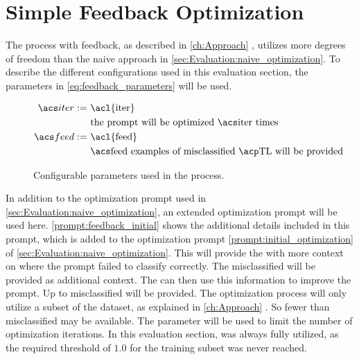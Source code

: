 \newpage


\section{Simple Feedback Optimization}
\label{sec:Evaluation:simple_feedback_optimization}

The \APE process with feedback, as described in \autoref{ch:Approach} , utilizes more degrees of freedom than the naive approach in \autoref{sec:Evaluation:naive_optimization}.
To describe the different configurations used in this evaluation section, the parameters in \autoref{eq:feedback_parameters} will be used.

\begin{figure}
    \raggedright
    \caption{Configurable parameters used in the \APE process. \\
    }
    \begin{equation}
        \label{eq:feedback_parameters}
        \begin{aligned}
            \iter := & \ \text{\acl{iter}} \\
            & \ \text{the prompt will be optimized \iter times} \\
            \feed :=    & \ \text{\acl{feed}} \\
            & \ \text{\feed examples of misclassified \TLs will be provided}
        \end{aligned}
    \end{equation}
\end{figure}

In addition to the optimization prompt used in \autoref{sec:Evaluation:naive_optimization}, an extended optimization prompt will be used here.
\autoref{prompt:feedback_initial} shows the additional details included in this prompt, which is added to the optimization prompt \autoref{prompt:initial_optimization} of \autoref{sec:Evaluation:naive_optimization}.
This will provide the \LLM with more context on where the prompt failed to classify correctly.
The misclassified \TLs will be provided as additional context.
The \LLM can then use this information to improve the prompt.
Up to \feed misclassified \TLs will be provided.
The optimization process will only utilize a subset of the dataset, as explained in \autoref{ch:Approach} .
So fewer than \feed misclassified \TLs may be available.
The parameter \iter will be used to limit the number of optimization iterations.
In this evaluation section, \iter was always fully utilized, as the required \fone threshold of $1.0$ for the training subset  was never reached.

